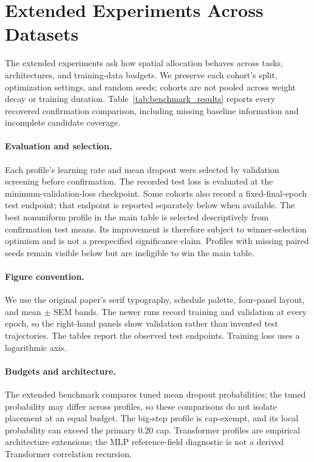\clearpage
\section{Extended Experiments Across Datasets}
\label{app:extended_experiments}
The extended experiments ask how spatial allocation behaves across tasks, architectures, and training-data budgets. We preserve each cohort's split, optimization settings, and random seeds; cohorts are not pooled across weight decay or training duration. Table~\ref{tab:benchmark_results} reports every recovered confirmation comparison, including missing baseline information and incomplete candidate coverage.
\paragraph{Evaluation and selection.} Each profile's learning rate and mean dropout were selected by validation screening before confirmation. The recorded test loss is evaluated at the minimum-validation-loss checkpoint. Some cohorts also record a fixed-final-epoch test endpoint; that endpoint is reported separately below when available. The best nonuniform profile in the main table is selected descriptively from confirmation test means. Its improvement is therefore subject to winner-selection optimism and is not a prespecified significance claim. Profiles with missing paired seeds remain visible below but are ineligible to win the main table.
\paragraph{Figure convention.} We use the original paper's serif typography, schedule palette, four-panel layout, and mean $\pm$ SEM bands. The newer runs record training and validation at every epoch, so the right-hand panels show validation rather than invented test trajectories. The tables report the observed test endpoints. Training loss uses a logarithmic axis.
\paragraph{Budgets and architecture.} The extended benchmark compares tuned mean dropout probabilities; the tuned probability may differ across profiles, so these comparisons do not isolate placement at an equal budget. The big-step profile is cap-exempt, and its local probability can exceed the primary $0.20$ cap. Transformer profiles are empirical architecture extensions; the MLP reference-field diagnostic is not a derived Transformer correlation recursion.
